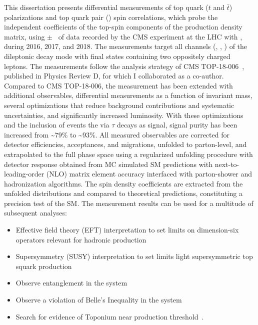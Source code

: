 This dissertation presents differential measurements of top quark ($t$ and $\bar{t}$) polarizations and top quark pair (\ttbar) spin correlations, which probe the independent coefficients of the top-spin components of the \ttbar production density matrix, using \lumivalueRuniiUL $\pm$ \lumierrRuniiUL\ of data recorded by the CMS experiment at the LHC with \beamenergy, during 2016, 2017, and 2018.
The measurements target all channels (\ee, \emu, \mumu) of the \ttbar dileptonic decay mode with final states containing two oppositely charged leptons.
The measurements follow the analysis strategy of CMS TOP-18-006~\cite{Sirunyan:2681777}, published in Physics Review D, for which I collaborated as a co-author.
Compared to CMS TOP-18-006, the measurement has been extended with additional observables, differential measurements as a function of \ttbar invariant mass, several optimizations that reduce background contributions and systematic uncertainties, and significantly increased luminosity.
With these optimizations and the inclusion of \ttbar events the via $\tau$ decays as signal, signal purity has been increased from \sim$79\%$ to \sim$93\%$.
All measured observables are corrected for detector efficiencies, acceptances, and migrations, unfolded to parton-level, and extrapolated to the full phase space using a regularized unfolding procedure with detector response obtained from MC simulated SM predictions with next-to-leading-order (NLO) matrix element accuracy interfaced with parton-shower and hadronization algorithms.
The spin density coefficients are extracted from the unfolded distributions and compared to theoretical predictions, constituting a precision test of the SM.
The measurement results can be used for a multitude of subsequent analyses:
\begin{itemize}
    \item Effective field theory (EFT) interpretation to set limits on dimension-six operators relevant for hadronic \ttbar production~\cite{Sirunyan:2681777}
    \item Supersymmetry (SUSY) interpretation to set limits light supersymmetric top squark production~\cite{CMS-PAS-FTR-18-034}
    \item Observe entanglement in the \ttbar system~\cite{Afik_2021}
    \item Observe a violation of Belle's Inequality in the \ttbar system~\cite{Aguilar_Saavedra_2022}
    \item Search for evidence of Toponium near \ttbar production threshold~\cite{PhysRevD.104.034023}.
\end{itemize}

